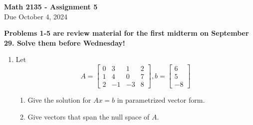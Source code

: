 \documentclass[12pt,a4paper]{amsart}
\newcommand{\vd}[3]{\left[\begin{matrix} #1 \\ #2 \\ #3 \end{matrix}\right]}
\begin{document}
\begin{center}
{\Large\textbf{Math 2135 - Assignment 5}}\\
\medskip
Due October 4, 2024 \\
\end{center}
\smallskip
\thispagestyle{empty}


{\bf Problems 1-5 are review material for the first midterm on September 29. Solve them before Wednesday!}


\begin{enumerate}
\item
 Let
\[ A = \left[\begin{matrix} 0 & 3 & 1 & 2 \\ 1 & 4 & 0 & 7 \\ 2 & -1 & -3 & 8 \end{matrix}\right], b = \vd{6}{5}{-8} \]
\begin{enumerate}
\item Give the solution for $Ax=b$ in parametrized vector form.
\item Give vectors that span the null space of $A$.
\end{enumerate}


\end{enumerate}
\end{document}
